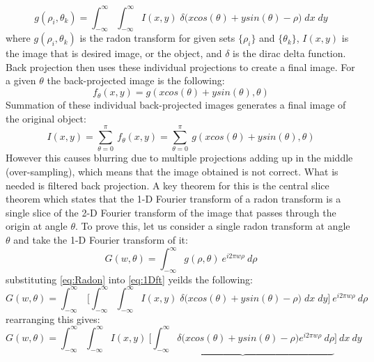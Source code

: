 \begin{equation}
g(\rho_i,\theta_k) = \int_{-\infty}^{\infty} \int_{-\infty}^{\infty} I(x,y) \; \delta \big(xcos(\theta) + ysin(\theta) - \rho \big) \; dx \; dy
\label{eq:Radon}
\end{equation}
where $g(\rho_i,\theta_k)$ is the radon transform for given sets $\{\rho_i\}$ and $\{\theta_k\}$, $I(x,y)$ is the image that is desired image, or the object, and $\delta$ is the dirac delta function. Back projection then uses these individual projections to create a final image.  For a given $\theta$ the back-projected image is the following:
\begin{equation}
f_{\theta}(x,y) = g(xcos(\theta) + ysin(\theta), \theta)
\end{equation}
Summation of these individual back-projected images generates a final image of the original object:
\begin{equation}
I(x,y) = \sum_{\theta=0}^{\pi} \: f_{\theta}(x,y) = \sum_{\theta=0}^{\pi} \: g(xcos(\theta) + ysin(\theta), \theta)
\end{equation}
However this causes blurring due to multiple projections adding up in the middle (over-sampling), which means that the image obtained is not correct. What is needed is filtered back projection.  A key theorem for this is the central slice theorem which states that the 1-D Fourier transform of a radon transform is a single slice of the 2-D Fourier transform of the image that passes through the origin at angle $\theta$. To prove this, let us consider a single radon transform at angle $\theta$ and take the 1-D Fourier transform of it:
\begin{equation}
G(w,\theta) = \int_{-\infty}^{\infty} g(\rho,\theta) \: e^{i2\pi  w \rho} \: d\rho
\label{eq:1Dft}
\end{equation}
substituting \ref{eq:Radon} into \ref{eq:1Dft} yeilds the following:
\begin{equation}
G(w,\theta) = \int_{-\infty}^{\infty} \: \biggl[  \int_{-\infty}^{\infty} \int_{-\infty}^{\infty} I(x,y) \; \delta \big(xcos(\theta) + ysin(\theta) - \rho \big) \; dx \; dy  \biggr] \: e^{i2\pi  w \rho} \: d\rho
\end{equation}
rearranging this gives:
\begin{equation}
G(w,\theta) = \int_{-\infty}^{\infty} \int_{-\infty}^{\infty} I(x,y) \: \biggl[ \underbrace{ \int_{-\infty}^{\infty} \delta \big(xcos(\theta) + ysin(\theta) - \rho \big) e^{i2\pi w \rho} \: d\rho} \biggr] \: dx \: dy
\end{equation}
